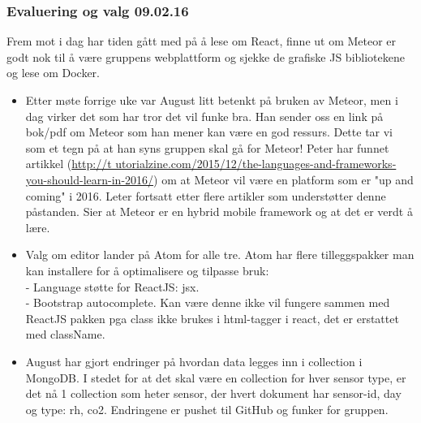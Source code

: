 \documentclass[12pt, oneside]{article}
\begin{document}
\subsubsection{Evaluering og valg 09.02.16}
Frem mot i dag har tiden gått med på å lese om React, finne ut om Meteor er godt nok til å være gruppens webplattform og sjekke de grafiske JS bibliotekene og lese om Docker. 
\begin{itemize}
	\item Etter møte forrige uke var August litt betenkt på bruken av Meteor, men i dag virker det som har tror det vil funke bra. Han sender oss en 	link på bok/pdf om 			Meteor som han mener kan være en god ressurs. Dette tar vi som et tegn på at han syns gruppen skal gå for Meteor! Peter har funnet artikkel (\url{http://t			utorialzine.com/2015/12/the-languages-and-frameworks-you-should-learn-in-2016/}) om at Meteor vil være en platform som er "up and coming" i 2016. Leter 			fortsatt etter flere artikler som understøtter denne påstanden. Sier at Meteor er en hybrid mobile framework og at det er verdt å lære.
	\item Valg om editor lander på Atom for alle tre. Atom har flere tilleggspakker man kan installere for å optimalisere og tilpasse bruk:\\
		 - Language støtte for ReactJS: jsx.\\
		 - Bootstrap autocomplete. Kan være denne ikke vil fungere sammen med ReactJS pakken pga class ikke brukes i html-tagger i react, det 		er erstattet med className.
	\item August har gjort endringer på hvordan data legges inn i collection i MongoDB. I stedet for at det skal være en collection for hver sensor 			type, er det nå 1 collection som heter sensor, der hvert dokument har  sensor-id, day og type: rh, co2. Endringene er pushet til 			GitHub og funker for gruppen.
\end{itemize}
\end{document}
